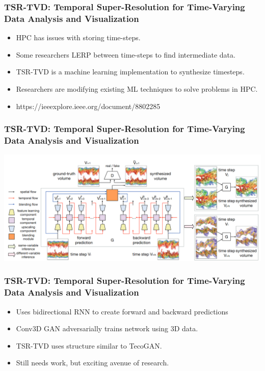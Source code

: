 \begin{frame}
\frametitle{TSR-TVD: Temporal Super-Resolution for Time-Varying Data Analysis and
    Visualization}
    \begin{itemize}
        \item HPC has issues with storing time-steps.
        \item Some researchers LERP between time-steps to find intermediate
        data.
        \item TSR-TVD is a machine learning implementation to synthesize
        timesteps.
        \item Researchers are modifying existing ML techniques to solve problems
        in HPC.
        \item https://ieeexplore.ieee.org/document/8802285
    \end{itemize}
\end{frame}

\begin{frame}
\frametitle{TSR-TVD: Temporal Super-Resolution for Time-Varying Data Analysis and
    Visualization}
    \center\includegraphics[width=0.9\paperwidth]{TSR.png}
\end{frame}

\begin{frame}
\frametitle{TSR-TVD: Temporal Super-Resolution for Time-Varying Data Analysis and
    Visualization}
    \begin{itemize}
        \item Uses bidirectional RNN to create forward and backward predictions
        \item Conv3D GAN adversarially trains network using 3D data.
        \item TSR-TVD uses structure similar to TecoGAN.
        \item Still needs work, but exciting avenue of research.
    \end{itemize}
\end{frame}

